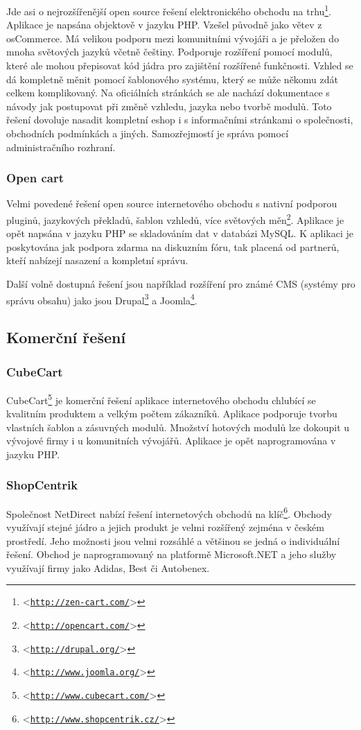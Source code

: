 \documentclass[11pt,twoside,a4paper]{book}
\let\oldUrl\url
\renewcommand\url[1]{<\texttt{\oldUrl{#1}}>}
\begin{document}
Jde asi o nejrozšířenější open source řešení elektronického obchodu na trhu\footnote{\url{http://zen-cart.com/}}. Aplikace je napsána objektově v jazyku PHP. Vzešel původně jako větev z osCommerce. Má velikou podporu mezi komunitními vývojáři a je přeložen do mnoha světových jazyků včetně češtiny. Podporuje rozšíření pomocí modulů, které ale mohou přepisovat kód jádra pro zajištění rozšířené funkčnosti. Vzhled se dá kompletně měnit pomocí šablonového systému, který  se může někomu zdát celkem komplikovaný. Na oficiálních stránkách se ale nachází dokumentace s návody jak postupovat při změně vzhledu, jazyka nebo tvorbě modulů. Toto řešení dovoluje nasadit kompletní eshop i s informačními stránkami o společnosti, obchodních podmínkách a jiných. Samozřejmostí je správa pomocí administračního rozhraní. 

\subsubsection{Open cart}

Velmi povedené řešení open source internetového obchodu s nativní podporou pluginů, jazykových překladů, šablon vzhledů, více světových měn\footnote{\url{http://opencart.com/}}. Aplikace je opět napsána v jazyku PHP se skladováním dat v databázi MySQL. K aplikaci je poskytována jak podpora zdarma na diskuzním fóru, tak placená od partnerů, kteří nabízejí nasazení a kompletní správu.

Další volně dostupná řešení jsou například rozšíření pro známé CMS (systémy pro správu obsahu) jako jsou Drupal\footnote{\url{http://drupal.org/}} a Joomla\footnote{\url{http://www.joomla.org/}}.


\subsection{Komerční řešení}

\subsubsection{CubeCart}

CubeCart\footnote{\url{http://www.cubecart.com/}} je komerční řešení aplikace internetového obchodu chlubící se kvalitním produktem a velkým počtem zákazníků. Aplikace podporuje tvorbu vlastních šablon a zásuvných modulů. Množství hotových modulů lze dokoupit u vývojové firmy i u komunitních vývojářů. Aplikace je opět naprogramována v jazyku PHP.

\subsubsection{ShopCentrik}
Společnost NetDirect nabízí řešení internetových obchodů na klíč\footnote{\url{http://www.shopcentrik.cz/}}. Obchody využívají stejné jádro a jejich produkt je velmi rozšířený zejména v českém prostředí. Jeho možnosti jsou velmi rozsáhlé a většinou se jedná o individuální řešení. Obchod je naprogramovaný na platformě Microsoft.NET a jeho služby využívají firmy jako Adidas, Best či Autobenex.
\end{document}

